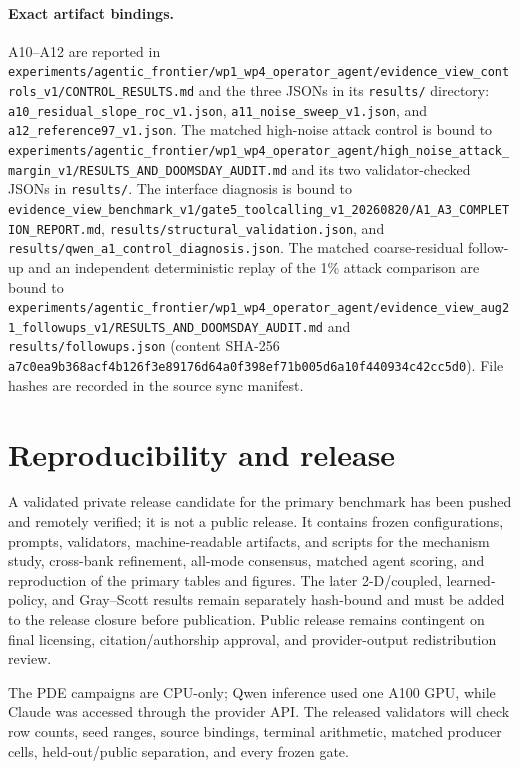 \documentclass{article}
\begin{document}
\paragraph{Exact artifact bindings.}
A10--A12 are reported in
\nolinkurl{experiments/agentic_frontier/wp1_wp4_operator_agent/evidence_view_controls_v1/CONTROL_RESULTS.md}
and the three JSONs in its \nolinkurl{results/} directory:
\nolinkurl{a10_residual_slope_roc_v1.json}, \nolinkurl{a11_noise_sweep_v1.json}, and
\nolinkurl{a12_reference97_v1.json}. The matched high-noise attack control is bound to
\nolinkurl{experiments/agentic_frontier/wp1_wp4_operator_agent/high_noise_attack_margin_v1/RESULTS_AND_DOOMSDAY_AUDIT.md}
and its two validator-checked JSONs in \nolinkurl{results/}. The interface diagnosis is bound to
\nolinkurl{evidence_view_benchmark_v1/gate5_toolcalling_v1_20260820/A1_A3_COMPLETION_REPORT.md},
\nolinkurl{results/structural_validation.json}, and
\nolinkurl{results/qwen_a1_control_diagnosis.json}. The matched coarse-residual follow-up and an
independent deterministic replay of the 1\% attack comparison are bound to
\nolinkurl{experiments/agentic_frontier/wp1_wp4_operator_agent/evidence_view_aug21_followups_v1/RESULTS_AND_DOOMSDAY_AUDIT.md}
and \nolinkurl{results/followups.json} (content SHA-256
\nolinkurl{a7c0ea9b368acf4b126f3e89176d64a0f398ef71b005d6a10f440934c42cc5d0}).
File hashes are recorded in the source sync manifest.

\section{Reproducibility and release}
\label{sec:reproducibility}

A validated private release candidate for the primary benchmark has been pushed and remotely
verified; it is not a public release. It contains frozen configurations, prompts, validators,
machine-readable artifacts, and scripts for the mechanism study, cross-bank refinement, all-mode
consensus, matched agent scoring, and reproduction of the primary tables and figures. The later
2-D/coupled, learned-policy, and Gray--Scott results remain separately hash-bound and must be added
to the release closure before publication. Public release remains contingent on final licensing,
citation/authorship approval, and provider-output redistribution review.

The PDE campaigns are CPU-only; Qwen inference used one A100 GPU, while Claude was accessed through
the provider API. The released validators will check row counts, seed ranges, source bindings,
terminal arithmetic, matched producer cells, held-out/public separation, and every frozen gate.
\end{document}

